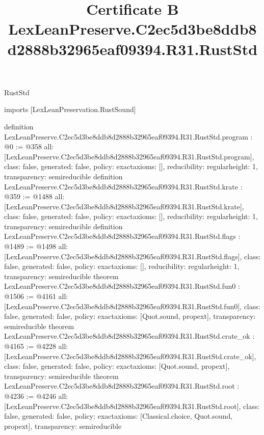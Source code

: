 \begin{lexlean}{RustStd}
\title{Certificate B LexLeanPreserve.C2ec5d3be8ddb8d2888b32965eaf09394.R31.RustStd}
\begin{coremodule}
imports [LexLeanPreservation.RustSound]

definition LexLeanPreserve.C2ec5d3be8ddb8d2888b32965eaf09394.R31.RustStd.program : @0 := @358 {
  all: [LexLeanPreserve.C2ec5d3be8ddb8d2888b32965eaf09394.R31.RustStd.program],
  class: false,
  generated: false,
  policy: exact{axioms: []},
  reducibility: regular{height: 1},
  transparency: semireducible
}
definition LexLeanPreserve.C2ec5d3be8ddb8d2888b32965eaf09394.R31.RustStd.krate : @359 := @1488 {
  all: [LexLeanPreserve.C2ec5d3be8ddb8d2888b32965eaf09394.R31.RustStd.krate],
  class: false,
  generated: false,
  policy: exact{axioms: []},
  reducibility: regular{height: 1},
  transparency: semireducible
}
definition LexLeanPreserve.C2ec5d3be8ddb8d2888b32965eaf09394.R31.RustStd.flags : @1489 := @1498 {
  all: [LexLeanPreserve.C2ec5d3be8ddb8d2888b32965eaf09394.R31.RustStd.flags],
  class: false,
  generated: false,
  policy: exact{axioms: []},
  reducibility: regular{height: 1},
  transparency: semireducible
}
theorem LexLeanPreserve.C2ec5d3be8ddb8d2888b32965eaf09394.R31.RustStd.fun0 : @1506 := @4161 {
  all: [LexLeanPreserve.C2ec5d3be8ddb8d2888b32965eaf09394.R31.RustStd.fun0],
  class: false,
  generated: false,
  policy: exact{axioms: [Quot.sound, propext]},
  transparency: semireducible
}
theorem LexLeanPreserve.C2ec5d3be8ddb8d2888b32965eaf09394.R31.RustStd.crate_ok : @4165 := @4228 {
  all: [LexLeanPreserve.C2ec5d3be8ddb8d2888b32965eaf09394.R31.RustStd.crate_ok],
  class: false,
  generated: false,
  policy: exact{axioms: [Quot.sound, propext]},
  transparency: semireducible
}
theorem LexLeanPreserve.C2ec5d3be8ddb8d2888b32965eaf09394.R31.RustStd.root : @4236 := @4246 {
  all: [LexLeanPreserve.C2ec5d3be8ddb8d2888b32965eaf09394.R31.RustStd.root],
  class: false,
  generated: false,
  policy: exact{axioms: [Classical.choice, Quot.sound, propext]},
  transparency: semireducible
}


\end{coremodule}
\end{lexlean}
